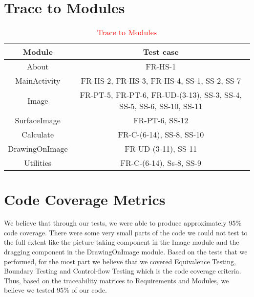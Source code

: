 \documentclass[12pt, titlepage]{article}
\begin{document}
\section{Trace to Modules}
\begin{table}[H]
     \centering
	\begin{tabular}{|c|c|}
		\hline
		\hline
		Module & Test case\\
		\hline
		About& FR-HS-1\\
		\hline
		MainActivity & FR-HS-2, FR-HS-3, FR-HS-4, SS-1, SS-2, SS-7\\
		\hline
		Image & FR-PT-5, FR-PT-6, FR-UD-(3-13), SS-3, SS-4, SS-5, SS-6, SS-10, SS-11\\ 
		\hline 
		SurfaceImage & FR-PT-6, SS-12\\
		\hline
	   	Calculate & FR-C-(6-14), SS-8, SS-10\\
	   	 \hline
	   	DrawingOnImage & FR-UD-(3-11), SS-11\\
		\hline
		Utilities & FR-C-(6-14), Ss-8, SS-9\\
		\hline
		\hline
		
	\end{tabular}
		\caption{\textcolor{red}{Trace to Modules}}
		\label{table}
\end{table}

\section{Code Coverage Metrics}
We believe that through our tests, we were able to produce approximately 95\% code coverage. There were some very small parts of the code we could not test to the full extent like the picture taking component in the Image module and the dragging component in the DrawingOnImage module. Based on the tests that we performed, for the most part we believe that we covered Equivalence Testing, Boundary Testing and Control-flow Testing which is the code coverage criteria. Thus, based on the traceability matrices to Requirements and Modules, we believe we tested 95\% of our code.




\end{document}
